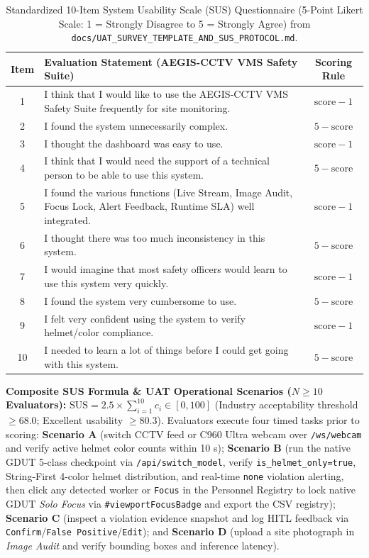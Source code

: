 \begin{table}[H]
\centering
\caption{Standardized 10-Item System Usability Scale (SUS) Questionnaire (5-Point Likert Scale: 1 = Strongly Disagree to 5 = Strongly Agree) from \nolinkurl{docs/UAT_SURVEY_TEMPLATE_AND_SUS_PROTOCOL.md}.}
\label{tab:app_sus_items}
\scriptsize\setlength{\tabcolsep}{4pt}
\renewcommand{\arraystretch}{1.08}
\begin{tabularx}{\textwidth}{|c|X|c|}
\hline
\rowcolor{slatehdr}
\textbf{Item} & \textbf{Evaluation Statement (AEGIS-CCTV VMS Safety Suite)} & \textbf{Scoring Rule} \\
\hline
1 & I think that I would like to use the AEGIS-CCTV VMS Safety Suite frequently for site monitoring. & $\text{score} - 1$ \\ \hline
2 & I found the system unnecessarily complex. & $5 - \text{score}$ \\ \hline
3 & I thought the dashboard was easy to use. & $\text{score} - 1$ \\ \hline
4 & I think that I would need the support of a technical person to be able to use this system. & $5 - \text{score}$ \\ \hline
5 & I found the various functions (Live Stream, Image Audit, Focus Lock, Alert Feedback, Runtime SLA) well integrated. & $\text{score} - 1$ \\ \hline
6 & I thought there was too much inconsistency in this system. & $5 - \text{score}$ \\ \hline
7 & I would imagine that most safety officers would learn to use this system very quickly. & $\text{score} - 1$ \\ \hline
8 & I found the system very cumbersome to use. & $5 - \text{score}$ \\ \hline
9 & I felt very confident using the system to verify helmet/color compliance. & $\text{score} - 1$ \\ \hline
10 & I needed to learn a lot of things before I could get going with this system. & $5 - \text{score}$ \\ \hline
\end{tabularx}
\end{table}

\noindent\textbf{Composite SUS Formula \& UAT Operational Scenarios ($N \ge 10$ Evaluators):} $\mathrm{SUS} = 2.5 \times \sum_{i=1}^{10} c_i \in [0, 100]$ (Industry acceptability threshold $\ge 68.0$; Excellent usability $\ge 80.3$). Evaluators execute four timed tasks prior to scoring: \textbf{Scenario A} (switch CCTV feed or C960 Ultra webcam over \texttt{/ws/webcam} and verify active helmet color counts within 10 s); \textbf{Scenario B} (run the native GDUT 5-class checkpoint via \nolinkurl{/api/switch_model}, verify \texttt{is\_helmet\_only=true}, String-First 4-color helmet distribution, and real-time \texttt{none} violation alerting, then click any detected worker or \texttt{Focus} in the Personnel Registry to lock native GDUT \textit{Solo Focus} via \texttt{\#viewportFocusBadge} and export the CSV registry); \textbf{Scenario C} (inspect a violation evidence snapshot and log HITL feedback via \texttt{Confirm}/\texttt{False Positive}/\texttt{Edit}); and \textbf{Scenario D} (upload a site photograph in \textit{Image Audit} and verify bounding boxes and inference latency).
\endgroup
